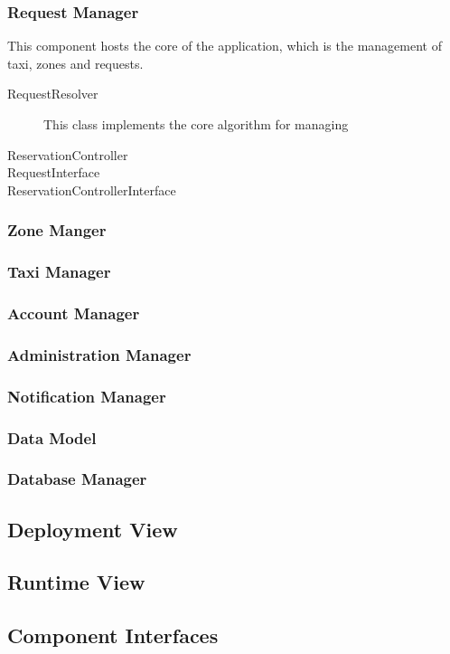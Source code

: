 \documentclass[11pt, a4paper,titlepage]{article}
\begin{document}
 \subsubsection{Request Manager}
	 This component hosts the core of the application, which is the management of taxi, zones and requests.
	  \begin{description}
	  	\item[RequestResolver] This class implements the core algorithm for managing 
	  	\item[ReservationController]
	  	\item[RequestInterface]
	  	\item[ReservationControllerInterface]
	  \end{description}
 \subsubsection{Zone Manger}
 \subsubsection{Taxi Manager}
 \subsubsection{Account Manager}
 \subsubsection{Administration Manager}
 \subsubsection{Notification Manager}
 \subsubsection{Data Model}
 \subsubsection{Database Manager}
 
	
\subsection{Deployment View}
\subsection{Runtime View}
\subsection{Component Interfaces}
\end{document}
